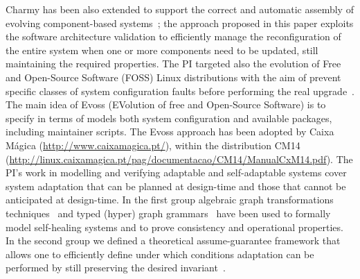 \documentclass[12pt]{article}
\begin{document}
Charmy has been also extended to support the correct and automatic assembly of evolving component-based systems~\cite{Pelliccione20082237}; the approach proposed in this paper exploits the software architecture validation to efficiently manage the reconfiguration of the entire system when one or more components need to be updated, still maintaining the required properties. The PI targeted also the evolution of Free and Open-Source Software (FOSS) Linux distributions with the aim of prevent specific classes of system configuration faults before performing the real upgrade~\cite{DiCosmo2011,DiRuscio2014,DiRuscio2015}. The main idea of Evoss (EVolution of free and Open-Source Software) is to specify in terms of models both system configuration and available packages, including maintainer scripts. %
The Evoss approach has been adopted by Caixa M\'agica ({\small \url{http://www.caixamagica.pt/}}), within the distribution CM14 ({\small \url{http://linux.caixamagica.pt/pag/documentacao/CM14/ManualCxM14.pdf}}).
The PI's work in modelling and verifying adaptable and self-adaptable systems cover system adaptation that can be planned at design-time and those that cannot be anticipated at design-time. In the first group algebraic graph transformations techniques~\cite{WICSA2009} and typed (hyper) graph grammars~\cite{Bucchiarone2015,Ehrig2010} have been used to formally model self-healing systems and to prove consistency and operational properties. In the second group we defined a theoretical assume-guarantee framework that allows one to efficiently define under which conditions adaptation can be performed by still preserving the desired invariant~\cite{IPT09}. 
\end{document}
